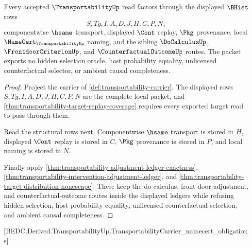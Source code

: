 \begin{theorem}
\label{thm:transportability-scope-exhaustion}
Every accepted $\TransportabilityUp$ read factors through the displayed $\BHist$ rows
$$
S,Tg,I,A,D,J,H,C,P,N,
$$
componentwise $\hsame$ transport, displayed $\Cont$ replay, $\Pkg$ provenance, local $\NameCert_{\TransportabilityUp}$ naming, and the sibling $\DoCalculusUp$, $\FrontdoorCriterionUp$, and $\CounterfactualOutcomeUp$ routes. The packet exports no hidden selection oracle, host probability equality, unlicensed counterfactual selector, or ambient causal completeness.
\end{theorem}
\begin{proof}
Project the carrier of \autoref{def:transportability-carrier}. The displayed rows $S,Tg,I,A,D,J,H,C,P,N$ are the complete local packet, and \autoref{thm:transportability-target-replay-coverage} requires every exported target read to pass through them.

Read the structural rows next. Componentwise $\hsame$ transport is stored in $H$, displayed $\Cont$ replay is stored in $C$, $\Pkg$ provenance is stored in $P$, and local naming is stored in $N$.

Finally apply \autoref{thm:transportability-adjustment-ledger-exactness}, \autoref{thm:transportability-intervention-adjustment-ledger}, and \autoref{thm:transportability-target-distribution-nonescape}. These keep the do-calculus, front-door adjustment, and counterfactual-outcome routes inside the displayed ledgers while refusing hidden selection, host probability equality, unlicensed counterfactual selection, and ambient causal completeness.
\end{proof}

[BEDC.Derived.TransportabilityUp.TransportabilityCarrier\_namecert\_obligations]

\begin{closurestatus}{\TransportabilityUp}
  \theoryclosure{\scopedClosure}
  \formalstatus{\theoremCheckedV}
\end{closurestatus}
